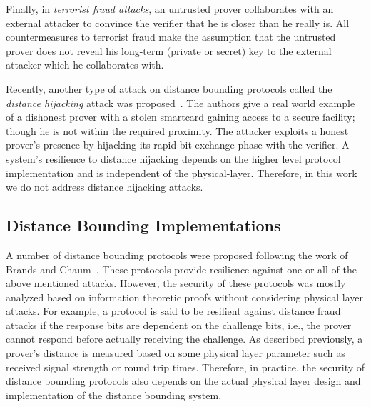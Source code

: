 \documentclass{sig-alternate-10pt}
\newcommand{\ie}{i.e.,\xspace}
\begin{document}
Finally, in \emph{terrorist fraud attacks}, an untrusted prover collaborates
with an external attacker to convince the verifier that he is closer than he
really is. All countermeasures to terrorist fraud make the assumption that the
untrusted prover does not reveal his long-term (private or secret) key to the
external attacker which he collaborates with.

Recently, another type of attack on distance bounding protocols called the
\emph{distance hijacking} attack was proposed~\cite{CremersMay12}. The authors
give a real world example of a dishonest prover with a stolen smartcard gaining
access to a secure facility; though he is not within the required proximity. The
attacker exploits a honest prover's presence by hijacking its rapid bit-exchange
phase with the verifier. A system's resilience to distance hijacking depends on
the higher level protocol implementation and is independent of the
physical-layer. Therefore, in this work we do not address distance hijacking
attacks.

\subsection{Distance Bounding Implementations}
\label{sec:compare-db-implementations}

A number of distance bounding protocols were proposed following the work of
Brands and Chaum~\cite{BrandsMay93}. These protocols provide resilience against
one or all of the above mentioned attacks. However, the security of these
protocols was mostly analyzed based on information theoretic proofs without
considering physical layer attacks. For example, a protocol is said to be
resilient against distance fraud attacks if the response bits are dependent on
the challenge bits, \ie the prover cannot respond before actually receiving the
challenge. As described previously, a prover's distance is measured based on
some physical layer parameter such as received signal strength or round trip
times. Therefore, in practice, the security of distance bounding protocols also
depends on the actual physical layer design and implementation of the distance
bounding system.
\end{document}
